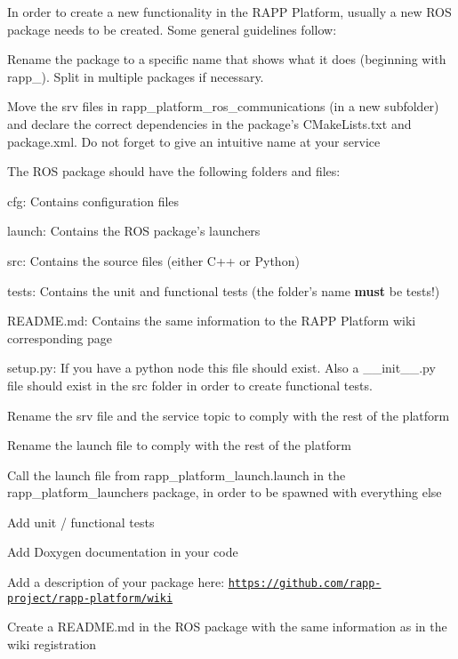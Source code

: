 In order to create a new functionality in the R\-A\-P\-P Platform, usually a new R\-O\-S package needs to be created. Some general guidelines follow\-:


\begin{DoxyItemize}
\item Rename the package to a specific name that shows what it does (beginning with {\ttfamily rapp\-\_\-}). Split in multiple packages if necessary.
\item Move the srv files in {\ttfamily rapp\-\_\-platform\-\_\-ros\-\_\-communications} (in a new subfolder) and declare the correct dependencies in the package's {\ttfamily C\-Make\-Lists.\-txt} and {\ttfamily package.\-xml}. Do not forget to give an intuitive name at your service
\item The R\-O\-S package should have the following folders and files\-:
\begin{DoxyItemize}
\item {\ttfamily cfg}\-: Contains configuration files
\item {\ttfamily launch}\-: Contains the R\-O\-S package's launchers
\item {\ttfamily src}\-: Contains the source files (either C++ or Python)
\item {\ttfamily tests}\-: Contains the unit and functional tests (the folder's name {\bfseries must} be {\ttfamily tests}!)
\item {\ttfamily R\-E\-A\-D\-M\-E.\-md}\-: Contains the same information to the R\-A\-P\-P Platform wiki corresponding page
\item {\ttfamily setup.\-py}\-: If you have a python node this file should exist. Also a {\ttfamily \-\_\-\-\_\-init\-\_\-\-\_\-.\-py} file should exist in the {\ttfamily src} folder in order to create functional tests.
\end{DoxyItemize}
\item Rename the srv file and the service topic to comply with the rest of the platform
\item Rename the launch file to comply with the rest of the platform
\item Call the launch file from {\ttfamily rapp\-\_\-platform\-\_\-launch.\-launch} in the {\ttfamily rapp\-\_\-platform\-\_\-launchers} package, in order to be spawned with everything else
\item Add unit / functional tests
\item Add Doxygen documentation in your code
\item Add a description of your package here\-: \href{https://github.com/rapp-project/rapp-platform/wiki}{\tt https\-://github.\-com/rapp-\/project/rapp-\/platform/wiki}
\item Create a R\-E\-A\-D\-M\-E.\-md in the R\-O\-S package with the same information as in the wiki registration 
\end{DoxyItemize}